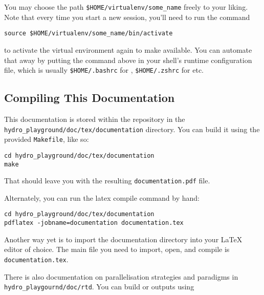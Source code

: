You may choose the path \verb|$HOME/virtualenv/some_name| freely to your liking.
Note that every time you start a new session, you'll need to run the command

\begin{lstlisting}
source $HOME/virtualenv/some_name/bin/activate
\end{lstlisting}

to activate the virtual environment again to make 
available. You can automate that away by putting the command above in your
shell's runtime configuration file, which is usually \verb|$HOME/.bashrc| for
, \verb|$HOME/.zshrc| for  etc.









\subsection{Compiling This Documentation}\label{chap:documentation}


This documentation is stored within the repository in the
\verb|hydro_playground/doc/tex/documentation| directory. You can build it using
the provided \verb|Makefile|, like so:


\begin{lstlisting}
cd hydro_playground/doc/tex/documentation
make
\end{lstlisting}

That should leave you with the resulting \verb|documentation.pdf| file.

Alternately, you can run the latex compile command by hand:

\begin{lstlisting}
cd hydro_playground/doc/tex/documentation
pdflatex -jobname=documentation documentation.tex
\end{lstlisting}

Another way yet is to import the documentation directory into your LaTeX editor
of choice. The main file you need to import, open, and compile is
\verb|documentation.tex|.






There is also documentation on parallelisation strategies and paradigms in \verb|hydro_playgournd/doc/rtd|.
You can build  or  outputs using

